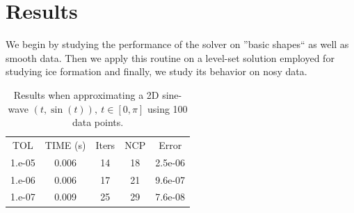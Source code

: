 \documentclass[a4paper,10pt]{article}
\begin{document}
   
\section{Results}
We begin by studying the performance of the solver on ''basic shapes`` as well as smooth data. 
Then we apply this routine on a level-set solution employed for studying ice formation and finally, we study 
 its behavior on nosy data. 
 
 \begin{table}
 \centering
  \begin{tabular}{|c| c| c|c |c|}
  \hline
 TOL&TIME (s)&Iters& NCP  & Error      \\ 
1.e-05&	0.006&	14&	18&	2.5e-06\\
1.e-06&	0.006&	17&	21&	9.6e-07\\
1.e-07&	0.009&	25&	29&	7.6e-08\\
\hline
   \end{tabular}
\caption{Results when approximating a 2D sine-wave $(t,\sin(t)), \ t\in[0,\pi]$ using 100 data points.}
 \end{table}
\end{document}
